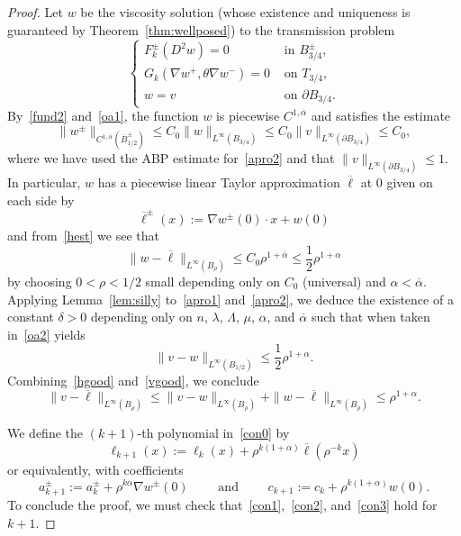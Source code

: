 \documentclass[letter,11pt]{amsart}
\theoremstyle{definition}
\numberwithin{equation}{section}
\begin{document}
\begin{proof}
Let $w$ be the viscosity solution (whose existence and uniqueness is guaranteed by Theorem~\ref{thm:wellposed}) to the transmission problem
\begin{equation}
\label{apro2}
\begin{cases}
F^{\pm}_k(D^2 w ) = 0 & \text{ in } B_{3/4}^{\pm},\\
G_k(\nabla w^{+}, \theta \nabla w^{-}) = 0 & \text{ on } T_{3/4},\\
w = v & \text{ on } \partial B_{3/4}.
\end{cases}
\end{equation}
By~\eqref{fund2} and~\eqref{oa1}, the function $w$ is piecewise $C^{1,\overline{\alpha}}$ and satisfies the estimate
\begin{equation}
\label{hest}
\|w^{\pm}\|_{C^{1,\overline{\alpha}}(\overline{B}^{\pm}_{1/2})} 
\leq C_0 \|w\|_{L^{\infty}(B_{3/4})}
\leq C_0 \|v\|_{L^{\infty}(\partial B_{3/4})} \leq C_0,
\end{equation}
where we have used the ABP estimate for~\eqref{apro2} and that $\|v\|_{L^{\infty}(\partial B_{3/4})} \leq 1$.
In particular, $w$ has a piecewise linear Taylor approximation $\overline{\ell}$ at $0$ given on each side by
\[
\overline{\ell}^{\pm}(x) := 
\nabla w^{\pm}(0) \cdot x + w(0)
\]
and from~\eqref{hest} we see that
\begin{equation}
\label{hgood}
\|w - \overline{\ell}\|_{L^{\infty}(B_{\rho})} \leq C_0 \rho^{1+\overline{\alpha}} \leq \frac{1}{2} \rho^{1+\alpha}
\end{equation}
by choosing $0 < \rho < 1/2$ small depending only on $C_0$ (universal) and $\alpha < \overline{\alpha}$.
Applying Lemma~\ref{lem:silly} to~\eqref{apro1} and~\eqref{apro2},
we deduce the existence of a constant
$\delta > 0$ 
depending only on $n$, $\lambda$, $\Lambda$, $\mu$, $\alpha$, and $\overline{\alpha}$ such that when taken in~\eqref{oa2} yields
\begin{equation}
\label{vgood}
\|v - w\|_{L^{\infty}(B_{1/2})} \leq \frac{1}{2}\rho^{1+\alpha}.
\end{equation}
Combining~\eqref{hgood} and~\eqref{vgood}, we conclude
\begin{equation}
\label{algo}
\|v - \overline{\ell}\|_{L^{\infty}(B_{\rho})} \leq \|v - w\|_{L^{\infty}(B_{\rho})} + \|w - \overline{\ell}\|_{L^{\infty}(B_{\rho})} \leq \rho^{1+\alpha}.
\end{equation}

\medskip

We define the $(k+1)$-th polynomial in~\eqref{con0} by
\[
\ell_{k+1}(x) := \ell_k(x) + \rho^{k(1+\alpha)} \overline{\ell}(\rho^{-k} x)
\]
or equivalently, with coefficients
\[
a_{k+1}^{\pm} := a_k^{\pm} + \rho^{k\alpha} \nabla w^{\pm}(0) \qquad \text{ and } \qquad c_{k+1} := c_k + \rho^{k(1+\alpha)} w(0).
\]
To conclude the proof, we must check that~\eqref{con1},~\eqref{con2}, and~\eqref{con3} hold for $k+1$.


\end{proof}
\end{document}
